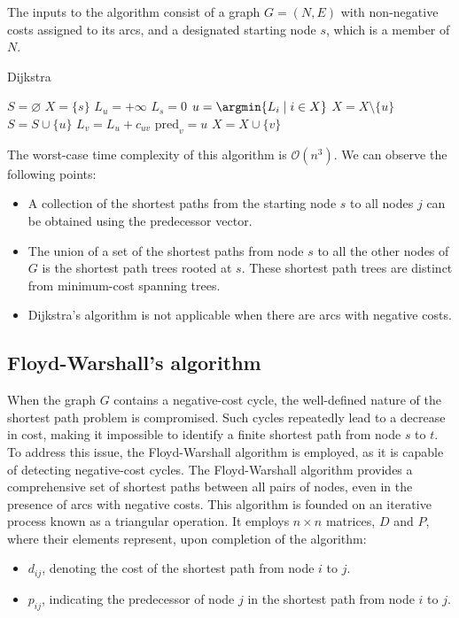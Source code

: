The inputs to the algorithm consist of a graph $G=(N, E)$ with non-negative costs assigned to its arcs, and a designated starting node $s$, which is a member of $N$.
\begin{algorithm}[H]
    \caption{Dijkstra}
        \begin{algorithmic}[1]
            \State $S = \varnothing$
            \State $X = \{s\}$
                \State $L_u = +\infty$
            \EndFor
            \State $L_s = 0$
                \State $u = \argmin\{L_i\mid i \in X\}$
                \State $X = X\setminus\{u\}$
                \State $S = S \cup \{u\}$
                    \State $L_v = L_u+c_{uv}$
                    \State $\text{pred}_v = u$
                    \State $X = X \cup \{v\}$
                \EndFor
            \EndWhile
        \end{algorithmic}
\end{algorithm}
The worst-case time complexity of this algorithm is $\mathcal{O}(n^3)$. 
We can observe the following points:
\begin{itemize}
    \item A collection of the shortest paths from the starting node $s$ to all nodes $j$ can be obtained using the predecessor vector.
    \item The union of a set of the shortest paths from node $s$ to all the other nodes of $G$ is the shortest path trees rooted at $s$. 
        These shortest path trees are distinct from minimum-cost spanning trees.
    \item Dijkstra's algorithm is not applicable when there are arcs with negative costs.
\end{itemize}

\subsection{Floyd-Warshall's algorithm}
When the graph $G$ contains a negative-cost cycle, the well-defined nature of the shortest path problem is compromised. 
Such cycles repeatedly lead to a decrease in cost, making it impossible to identify a finite shortest path from node $s$ to $t$.
To address this issue, the Floyd-Warshall algorithm is employed, as it is capable of detecting negative-cost cycles.
The Floyd-Warshall algorithm provides a comprehensive set of shortest paths between all pairs of nodes, even in the presence of arcs with negative costs. 
This algorithm is founded on an iterative process known as a triangular operation.
It employs $n \times n$ matrices, $D$ and $P$, where their elements represent, upon completion of the algorithm:
\begin{itemize}
    \item $d_{ij}$, denoting the cost of the shortest path from node $i$ to $j$.
    \item $p_{ij}$, indicating the predecessor of node $j$ in the shortest path from node $i$ to $j$.
\end{itemize}

